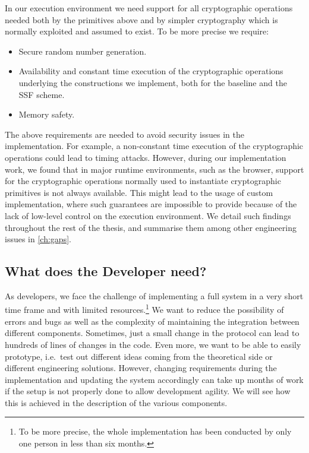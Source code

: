 In our execution environment 
we need support for all cryptographic operations
needed both by the primitives above and by simpler
cryptography which is normally exploited and assumed to exist. 
To be more precise we require:
\begin{itemize}
    \item Secure random number generation.
    \item Availability and constant time execution of the cryptographic operations underlying the constructions we implement, both for the baseline and the SSF scheme.
    \item Memory safety.
\end{itemize}
The above requirements are needed to avoid security
issues in the implementation. For example, a non-constant
time execution of the cryptographic operations could
lead to timing attacks. 
However, during our implementation work, 
we found that in major runtime
environments, such as the browser, 
support for the cryptographic operations normally
used to instantiate cryptographic primitives is not always available.
This might lead to the usage of custom implementation,
where such guarantees are impossible to provide because
of the lack of low-level control on the execution environment.
We detail such findings throughout the rest of the thesis,
and summarise them among other engineering issues in \cref{ch:gaps}.

\subsection{What does the Developer need?}\label{sc:developer}

As developers, we face the challenge of implementing a full
system in a very short time frame and with limited resources.\footnote{To be more precise, the whole implementation has been conducted by only one person in less than six months.}
We want to reduce the possibility of errors and bugs
as well as the complexity of maintaining the integration between
different components.
Sometimes, just a small change in the protocol can lead to
hundreds of lines of changes in the code.
Even more, we want to be able to easily prototype, i.e.\ test
out different ideas coming from the theoretical side
or different engineering solutions.
However, changing requirements during the implementation
and updating the system accordingly can take up months of work
if the setup is not properly done to allow development agility.
We will see how this is achieved in the description of the various components.


